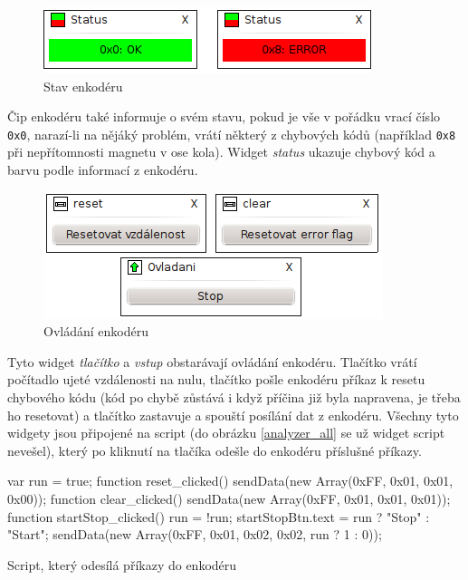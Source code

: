 \documentclass[12pt, a4paper, oneside]{article}
\newcommand{\It}{\textit}  %
\begin{document}
\begin{figure}[H]
\begin{center}
\includegraphics[width=\textwidth]{img/enc_status.png}
\caption{Stav enkodéru}
\end{center}
\end{figure}
Čip enkodéru také informuje o svém stavu, pokud je vše v pořádku vrací číslo \verb|0x0|, narazí-li na nějáký problém, vrátí některý z chybových kódů (například \verb|0x8| při nepřítomnosti magnetu v ose kola). Widget \It{status} ukazuje chybový kód a barvu podle informací z enkodéru.

\begin{figure}[H]
\begin{center}
\includegraphics[width=\textwidth-50pt]{img/enc_ctrl.png}
\caption{Ovládání enkodéru}
\end{center}
\end{figure}
Tyto widget \It{tlačítko} a \It{vstup} obstarávají ovládání enkodéru. Tlačítko  vrátí počítadlo ujeté vzdálenosti na nulu, tlačítko  pošle enkodéru příkaz k resetu chybového kódu (kód po chybě zůstává i když příčina již byla napravena, je třeba ho resetovat) a tlačítko  zastavuje a spouští posílání dat z enkodéru. Všechny tyto widgety jsou připojené na script (do obrázku \ref{analyzer_all} se už widget script nevešel), který po kliknutí na tlačíka odešle do enkodéru příslušné příkazy.
\begin{listing}[H]
\begin{jscode}
var run = true;
function reset_clicked() {
    sendData(new Array(0xFF, 0x01, 0x01, 0x00));
}
function clear_clicked() {
    sendData(new Array(0xFF, 0x01, 0x01, 0x01));
}
function startStop_clicked() {
    run = !run;
    startStopBtn.text = run ? "Stop" : "Start";
    sendData(new Array(0xFF, 0x01, 0x02, 0x02, run ? 1 : 0));
}
\end{jscode}
\caption{Script, který odesílá příkazy do enkodéru}
\end{listing}
\end{document}
